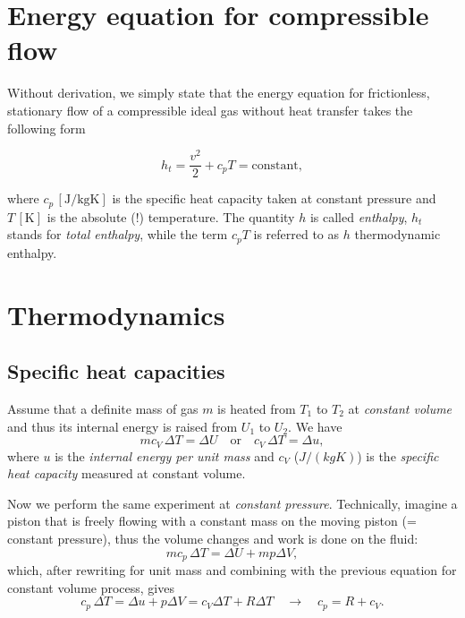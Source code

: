 \section{Energy equation for compressible flow}

Without derivation, we simply state that the energy equation for frictionless, stationary flow of a compressible ideal gas without heat transfer
takes the following form

\begin{equation}
h_t=\frac{v^2}{2}+c_p T=\mathrm{constant},
\end{equation}

where $c_p\,[\mathrm{J/kgK}]$ is the specific heat capacity taken at constant pressure and $T\,[\mathrm{K}]$ is the absolute (!) temperature. The quantity $h$ is called \emph{enthalpy}, $h_t$ stands for \emph{total enthalpy}, while the term $c_pT$ is referred to as $h$ thermodynamic enthalpy.

\section{Thermodynamics}

\subsection{Specific heat capacities}

Assume that a definite mass of gas $m$ is heated from $T_1$ to $T_2$ at \emph{constant volume} and thus its internal energy is raised from $U_1$ to $U_2$. We have
%
\begin{equation}
m c_V\, \Delta T=\Delta U \quad \text{or} \quad c_V\,\Delta T=\Delta u,
\end{equation}
%
where $u$ is the \emph{internal energy per unit mass} and $c_V$ ($J/(kgK)$) is the \emph{specific heat capacity} measured at constant volume.

Now we perform the same experiment at \emph{constant pressure}. Technically, imagine a piston that is freely flowing with a constant mass on the moving piston (= constant pressure), thus the volume changes and work is done on the fluid:
%
\begin{equation}
m c_p\, \Delta T=\Delta U + m p \Delta V,
\end{equation}
%
which, after rewriting for unit mass and combining with the previous equation for constant volume process,  gives
%
\begin{equation}
c_p\,\Delta T=\Delta u+p \Delta V=c_V \Delta T + R \Delta T \quad \rightarrow \quad c_p=R+c_V.
\end{equation}

